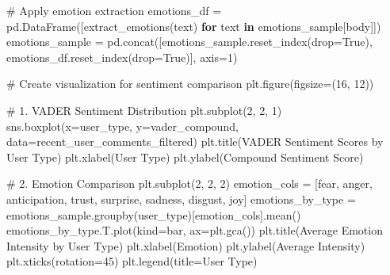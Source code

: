 \documentclass[
  12pt,
  letterpaper,
  DIV=11,
  numbers=noendperiod]{scrartcl}
\newenvironment{Shaded}{\begin{snugshade}}{\end{snugshade}}
\newcommand{\CommentTok}[1]{\textcolor[rgb]{0.37,0.37,0.37}{#1}}
\newcommand{\ControlFlowTok}[1]{\textcolor[rgb]{0.00,0.23,0.31}{\textbf{#1}}}
\newcommand{\DecValTok}[1]{\textcolor[rgb]{0.68,0.00,0.00}{#1}}
\newcommand{\KeywordTok}[1]{\textcolor[rgb]{0.00,0.23,0.31}{\textbf{#1}}}
\newcommand{\NormalTok}[1]{\textcolor[rgb]{0.00,0.23,0.31}{#1}}
\newcommand{\OperatorTok}[1]{\textcolor[rgb]{0.37,0.37,0.37}{#1}}
\newcommand{\StringTok}[1]{\textcolor[rgb]{0.13,0.47,0.30}{#1}}
\newcommand{\VariableTok}[1]{\textcolor[rgb]{0.07,0.07,0.07}{#1}}
\begin{document}
\begin{Shaded}
\begin{Highlighting}[]
\CommentTok{\# Apply emotion extraction}
\NormalTok{emotions\_df }\OperatorTok{=}\NormalTok{ pd.DataFrame([extract\_emotions(text) }\ControlFlowTok{for}\NormalTok{ text }\KeywordTok{in}\NormalTok{ emotions\_sample[}\StringTok{\textquotesingle{}body\textquotesingle{}}\NormalTok{]])}
\NormalTok{emotions\_sample }\OperatorTok{=}\NormalTok{ pd.concat([emotions\_sample.reset\_index(drop}\OperatorTok{=}\VariableTok{True}\NormalTok{), emotions\_df.reset\_index(drop}\OperatorTok{=}\VariableTok{True}\NormalTok{)], axis}\OperatorTok{=}\DecValTok{1}\NormalTok{)}

\CommentTok{\# Create visualization for sentiment comparison}
\NormalTok{plt.figure(figsize}\OperatorTok{=}\NormalTok{(}\DecValTok{16}\NormalTok{, }\DecValTok{12}\NormalTok{))}

\CommentTok{\# 1. VADER Sentiment Distribution}
\NormalTok{plt.subplot(}\DecValTok{2}\NormalTok{, }\DecValTok{2}\NormalTok{, }\DecValTok{1}\NormalTok{)}
\NormalTok{sns.boxplot(x}\OperatorTok{=}\StringTok{\textquotesingle{}user\_type\textquotesingle{}}\NormalTok{, y}\OperatorTok{=}\StringTok{\textquotesingle{}vader\_compound\textquotesingle{}}\NormalTok{, data}\OperatorTok{=}\NormalTok{recent\_user\_comments\_filtered)}
\NormalTok{plt.title(}\StringTok{\textquotesingle{}VADER Sentiment Scores by User Type\textquotesingle{}}\NormalTok{)}
\NormalTok{plt.xlabel(}\StringTok{\textquotesingle{}User Type\textquotesingle{}}\NormalTok{)}
\NormalTok{plt.ylabel(}\StringTok{\textquotesingle{}Compound Sentiment Score\textquotesingle{}}\NormalTok{)}

\CommentTok{\# 2. Emotion Comparison}
\NormalTok{plt.subplot(}\DecValTok{2}\NormalTok{, }\DecValTok{2}\NormalTok{, }\DecValTok{2}\NormalTok{)}
\NormalTok{emotion\_cols }\OperatorTok{=}\NormalTok{ [}\StringTok{\textquotesingle{}fear\textquotesingle{}}\NormalTok{, }\StringTok{\textquotesingle{}anger\textquotesingle{}}\NormalTok{, }\StringTok{\textquotesingle{}anticipation\textquotesingle{}}\NormalTok{, }\StringTok{\textquotesingle{}trust\textquotesingle{}}\NormalTok{, }\StringTok{\textquotesingle{}surprise\textquotesingle{}}\NormalTok{, }\StringTok{\textquotesingle{}sadness\textquotesingle{}}\NormalTok{, }\StringTok{\textquotesingle{}disgust\textquotesingle{}}\NormalTok{, }\StringTok{\textquotesingle{}joy\textquotesingle{}}\NormalTok{]}
\NormalTok{emotions\_by\_type }\OperatorTok{=}\NormalTok{ emotions\_sample.groupby(}\StringTok{\textquotesingle{}user\_type\textquotesingle{}}\NormalTok{)[emotion\_cols].mean()}
\NormalTok{emotions\_by\_type.T.plot(kind}\OperatorTok{=}\StringTok{\textquotesingle{}bar\textquotesingle{}}\NormalTok{, ax}\OperatorTok{=}\NormalTok{plt.gca())}
\NormalTok{plt.title(}\StringTok{\textquotesingle{}Average Emotion Intensity by User Type\textquotesingle{}}\NormalTok{)}
\NormalTok{plt.xlabel(}\StringTok{\textquotesingle{}Emotion\textquotesingle{}}\NormalTok{)}
\NormalTok{plt.ylabel(}\StringTok{\textquotesingle{}Average Intensity\textquotesingle{}}\NormalTok{)}
\NormalTok{plt.xticks(rotation}\OperatorTok{=}\DecValTok{45}\NormalTok{)}
\NormalTok{plt.legend(title}\OperatorTok{=}\StringTok{\textquotesingle{}User Type\textquotesingle{}}\NormalTok{)}


\end{Highlighting}
\end{Shaded}
\end{document}
